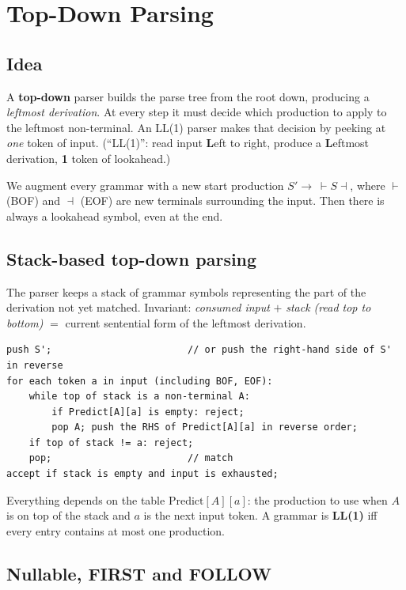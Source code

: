 \chapter{Top-Down Parsing}

\section{Idea}

A \textbf{top-down} parser builds the parse tree from the root down, producing a
\emph{leftmost derivation}. At every step it must decide which production to apply to the
leftmost non-terminal. An LL(1) parser makes that decision by peeking at \emph{one} token of
input. (``LL(1)'': read input \textbf{L}eft to right, produce a \textbf{L}eftmost derivation,
\textbf{1} token of lookahead.)

We augment every grammar with a new start production $S' \to\ \vdash S \dashv$, where
$\vdash$ (BOF) and $\dashv$ (EOF) are new terminals surrounding the input. Then there is
always a lookahead symbol, even at the end.

\section{Stack-based top-down parsing}

The parser keeps a stack of grammar symbols representing the part of the derivation not yet
matched. Invariant: \emph{consumed input} $+$ \emph{stack (read top to bottom)} $=$ current
sentential form of the leftmost derivation.

\begin{lstlisting}[style=cpp]
push S';                        // or push the right-hand side of S' in reverse
for each token a in input (including BOF, EOF):
    while top of stack is a non-terminal A:
        if Predict[A][a] is empty: reject;
        pop A; push the RHS of Predict[A][a] in reverse order;
    if top of stack != a: reject;
    pop;                        // match
accept if stack is empty and input is exhausted;
\end{lstlisting}

Everything depends on the table $\mathrm{Predict}[A][a]$: the production to use when $A$ is on
top of the stack and $a$ is the next input token. A grammar is \textbf{LL(1)} iff every entry
contains at most one production.

\section{Nullable, FIRST and FOLLOW}

